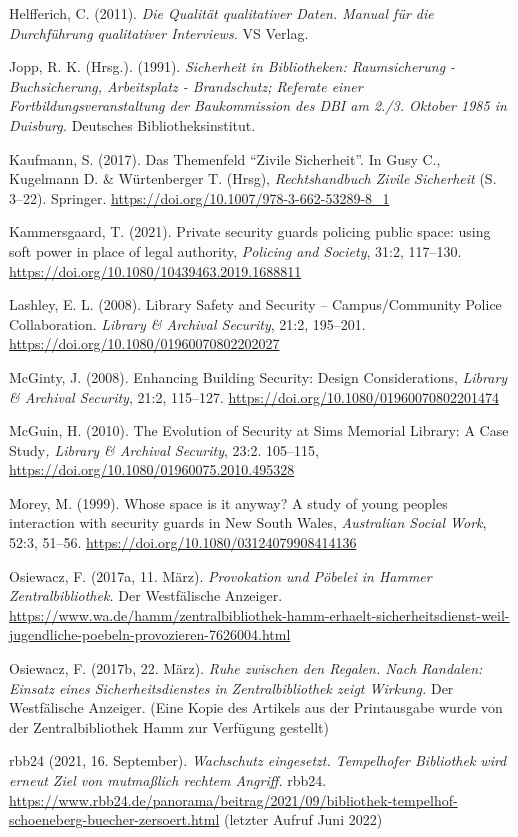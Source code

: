\documentclass[a4paper,
fontsize=11pt,
oneside,
numbers=noperiodatend,
parskip=half-,
bibliography=totoc,
final
]{scrartcl}
\begin{document}
Helfferich, C. (2011). \emph{Die Qualität qualitativer Daten. Manual für
die Durchführung qualitativer Interviews.} VS Verlag.

Jopp, R. K. (Hrsg.). (1991). \emph{Sicherheit in Bibliotheken:
Raumsicherung - Buchsicherung, Arbeitsplatz - Brandschutz; Referate
einer Fortbildungsveranstaltung der Baukommission des DBI am 2./3.
Oktober 1985 in Duisburg.} Deutsches Bibliotheksinstitut.

Kaufmann, S. (2017). Das Themenfeld \enquote{Zivile Sicherheit}. In Gusy
C., Kugelmann D. \& Würtenberger T. (Hrsg), \emph{Rechtshandbuch Zivile}
\emph{Sicherheit} (S. 3--22). Springer.
\url{https://doi.org/10.1007/978-3-662-53289-8_1}

Kammersgaard, T. (2021). Private security guards policing public space:
using soft power in place of legal authority, \emph{Policing and
Society}, 31:2, 117--130.
\url{https://doi.org/10.1080/10439463.2019.1688811}

Lashley, E. L. (2008). Library Safety and Security -- Campus/Community
Police Collaboration. \emph{Library \& Archival Security}, 21:2,
195--201. \url{https://doi.org/10.1080/01960070802202027}

McGinty, J. (2008). Enhancing Building Security: Design Considerations,
\emph{Library \& Archival Security}, 21:2, 115--127. \url{https://doi.org/10.1080/01960070802201474}

McGuin, H. (2010). The Evolution of Security at Sims Memorial Library: A
Case Study\emph{, Library \& Archival Security}, 23:2. 105--115, \url{https://doi.org/10.1080/01960075.2010.495328}

Morey, M. (1999). Whose space is it anyway? A study of young
people\textquotesingle s interaction with security guards in New South
Wales, \emph{Australian Social Work}, 52:3, 51--56.
\url{https://doi.org/10.1080/03124079908414136}

Osiewacz, F. (2017a, 11. März). \emph{Provokation und Pöbelei in Hammer
Zentralbibliothek.} Der Westfälische Anzeiger.
\url{https://www.wa.de/hamm/zentralbibliothek-hamm-erhaelt-sicherheitsdienst-weil-jugendliche-poebeln-provozieren-7626004.html}

Osiewacz, F. (2017b, 22. März). \emph{Ruhe zwischen den Regalen. Nach
Randalen: Einsatz eines Sicherheitsdienstes in Zentralbibliothek zeigt
Wirkung.} Der Westfälische Anzeiger. (Eine Kopie des Artikels aus der
Printausgabe wurde von der Zentralbibliothek Hamm zur Verfügung
gestellt)

rbb24 (2021, 16. September). \emph{Wachschutz eingesetzt. Tempelhofer
Bibliothek wird erneut Ziel von mutmaßlich rechtem Angriff.} rbb24.
\url{https://www.rbb24.de/panorama/beitrag/2021/09/bibliothek-tempelhof-schoeneberg-buecher-zersoert.html}
(letzter Aufruf Juni 2022)
\end{document}
